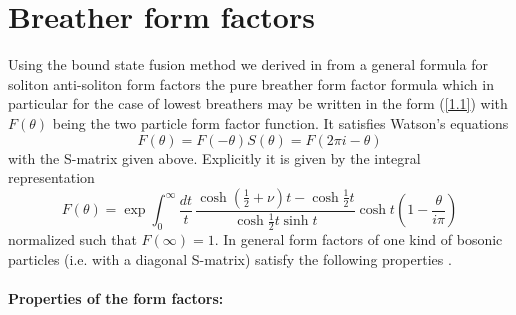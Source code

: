 \documentclass[a4paper,a4paper]{article}
\begin{document}
\section{Breather form factors\label{s2}}

Using the bound state fusion method we derived in \cite{BK} from a general
formula for soliton anti-soliton form factors the pure breather form factor
formula which in particular for the case of lowest breathers may be written
in the form (\ref{1.1}) with $F(\theta )$ being the two particle form factor
function. It satisfies Watson's equations 
\[
F(\theta )=F(-\theta )S(\theta )=F(2\pi i-\theta ) 
\]
with the S-matrix given above. Explicitly it is given by the integral
representation \cite{KW} 
\begin{equation}
F(\theta )=\exp \int_{0}^{\infty }\frac{dt}{t}\,\frac{\cosh \left( \frac{1}{2%
}+\nu \right) t-\cosh \frac{1}{2}t}{\cosh \frac{1}{2}t\sinh t}\cosh t\left(
1-\frac{\theta }{i\pi }\right)  \label{2.1}
\end{equation}
normalized such that $F(\infty )=1$. In general form factors of one kind of
bosonic particles (i.e. with a diagonal S-matrix) satisfy the following
properties \cite{KW,Sm,BFKZ}.

\paragraph{Properties of the form factors:}
\end{document}

